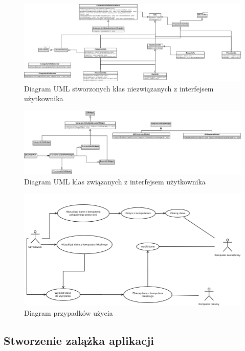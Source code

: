 \documentclass[a4paper]{article}
\begin{document}
\begin{figure}[h]
	\centering
	\includegraphics[width=0.75\paperheight, angle=90]{img/diagramKlas.png}
	\caption{Diagram UML stworzonych klas niezwiązanych z interfejsem użytkownika}
	\label{diagram_klas_system_monitoring}
\end{figure}

\begin{figure}[h]
	\centering
	\includegraphics[width=0.75\paperheight, angle=90]{img/diagramKlasGui.png}
	\caption{Diagram UML klas związanych z interfejsem użytkownika}
	\label{diagram_klas_gui}
\end{figure}

\begin{figure}[h]
	\centering
	\includegraphics[width=0.75\paperheight, angle=90]{img/diagramPrzypadkowUzycia.png}
	\caption{Diagram przypadków użycia}
	\label{diagram_przypadkow_uzycia}
\end{figure}

\subsection{Stworzenie zalążka aplikacji}
\end{document}
